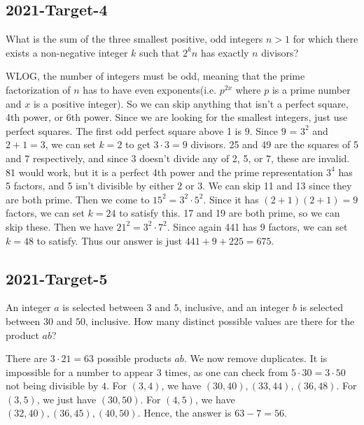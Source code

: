 \documentclass[12pt]{article}
\begin{document}
\subsection*{2021-Target-4}
What is the sum of the three smallest positive, odd integers $n > 1$ for which there exists a non-negative integer $k$ such that $2^kn$ has exactly $n$ divisors?
\begin{answer}
WLOG, the number of integers must be odd, meaning that the prime factorization of $n$ has to have even exponents(i.e. $p^{2x}$ where $p$ is a prime number and $x$ is a positive integer). So we can skip anything that isn't a perfect square, 4th power, or 6th power. Since we are looking for the smallest integers, just use perfect squares. The first odd perfect square above 1 is $9$. Since $9$ = $3^2$ and $2+1 = 3$, we can set $k=2$ to get $3 \cdot 3 = 9$ divisors. 25 and 49 are the squares of 5 and 7 respectively, and since 3 doesn't divide any of 2, 5, or 7, these are invalid. 81 would work, but it is a perfect 4th power and the prime representation $3^4$ has 5 factors, and 5 isn't divisible by either 2 or 3. We can skip 11 and 13 since they are both prime. Then we come to $15^2 = 3^2 \cdot 5^2$. Since it has $(2+1)(2+1) = 9$ factors, we can set $k = 24$ to satisfy this. 17 and 19 are both prime, so we can skip these. Then we have $21^2 = 3^2 \cdot 7^2$. Since again 441 has 9 factors, we can set $k=48$ to satisfy. Thus our answer is just $441 + 9 + 225 = \boxed{675}$.
\end{answer}

\subsection*{2021-Target-5}
An integer $a$ is selected between $3$ and $5$, inclusive, and an integer $b$ is selected between $30$ and $50$, inclusive. How many distinct possible values are there for the product $ab$?
\begin{answer}
There are $3\cdot 21 = 63$ possible products $ab$. We now remove duplicates. It is impossible for a number to appear $3$ times, as one can check from $5\cdot 30 = 3\cdot 50$ not being divisible by $4$. For $(3, 4)$, we have $(30, 40), (33, 44), (36, 48)$. For $(3, 5)$, we just have $(30, 50)$. For $(4, 5)$, we have $(32, 40), (36, 45), (40, 50)$. Hence, the answer is $63-7=\boxed{56}$.
\end{answer}
\end{document}
